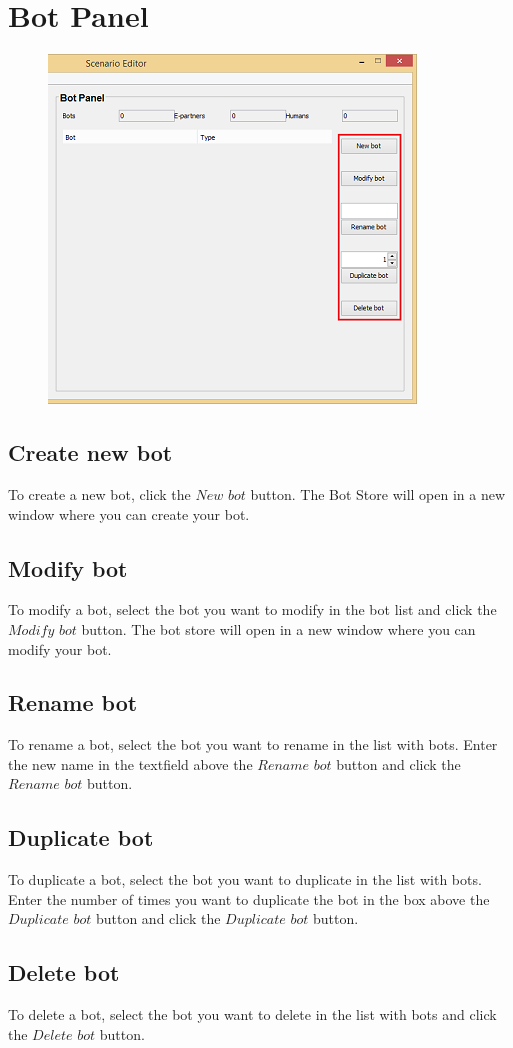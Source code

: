 \documentclass[a4paper]{article}
\begin{document}
\section{Bot Panel}
\begin{figure}
\includegraphics{bot.png}
\end{figure}
\subsection{Create new bot}
To create a new bot, click the $New$ $bot$ button. The Bot Store will open in a new window where you can create your bot.

\subsection{Modify bot}
To modify a bot, select the bot you want to modify in the bot list and click the $Modify$ $bot$ button. The bot store will open in a new window where you can modify your bot.

\subsection{Rename bot}
To rename a bot, select the bot you want to rename in the list with bots. Enter the new name in the textfield above the $Rename$ $bot$ button and click the $Rename$ $bot$ button.

\subsection{Duplicate bot}
To duplicate a bot, select the bot you want to duplicate in the list with bots. Enter the number of times you want to duplicate the bot in the box above the $Duplicate$ $bot$ button and click the $Duplicate$ $bot$ button.

\subsection{Delete bot}
To delete a bot, select the bot you want to delete in the list with bots and click the $Delete$ $bot$ button.
\end{document}
